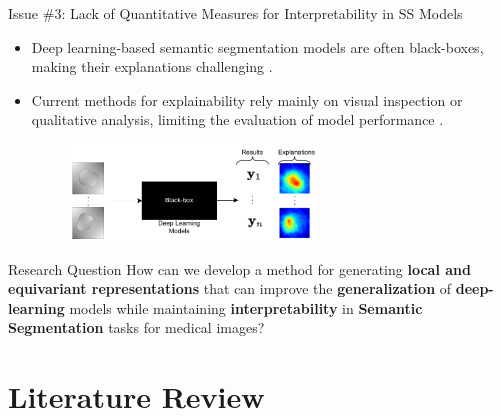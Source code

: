\documentclass[aspectratio=169]{beamer}
\let\oldcite\cite %
\renewcommand{\cite}[1]{{\tiny\oldcite{#1}}}
\begin{document}
\begin{frame}{{\fontsize{13pt}{13pt}\selectfont  Issue \#3: Lack of Quantitative Measures for Interpretability in SS Models}}

\begin{itemize}
\setlength\itemsep{1em}
    \item  Deep learning-based semantic segmentation models are often black-boxes, making their explanations challenging \cite{linardatos2020explainable}. 
    \item Current methods for explainability rely mainly on visual inspection or qualitative analysis, limiting the evaluation of model performance \cite{Wang_2022, salahuddin2022transparency}. 

    \begin{figure}
        \centering
        \includegraphics[width=0.61\textwidth]{Figures/lack_interpretability.pdf}
        
    \end{figure}
\end{itemize}

\end{frame}


\begin{frame}{Research Question}
    How can we develop a method for generating \textbf{local and equivariant representations} that can improve the \textbf{generalization} of \textbf{deep-learning} models while maintaining \textbf{interpretability} in \textbf{Semantic Segmentation} tasks for medical images?
\end{frame}



\section{Literature Review}
\end{document}
